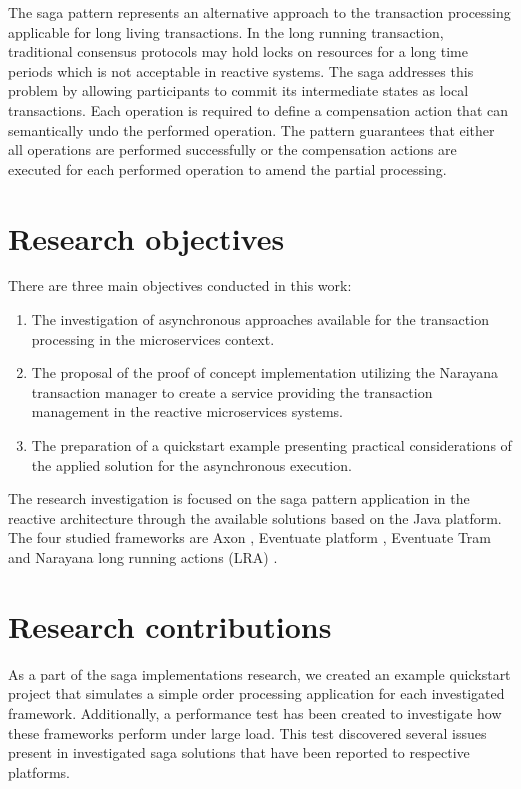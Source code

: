 \documentclass[oneside,
  digital, %
  table,   %
  nolof,     %
  nolot,     %
]{fithesis3}
\begin{document}
The saga pattern \cite{sagas_publ} represents an alternative approach to the transaction processing applicable for long living transactions. In the long running transaction, traditional consensus protocols may hold locks on resources for a long time periods which is not acceptable in reactive systems. The saga addresses this problem by allowing participants to commit its intermediate states as local transactions. Each operation is required to define a compensation action that can semantically undo the performed operation. The pattern guarantees that either all operations are performed successfully or the compensation actions are executed for each performed operation to amend the partial processing.

\section{Research objectives}

There are three main objectives conducted in this work:

\begin{enumerate}
    \item The investigation of asynchronous approaches available for the transaction processing in the microservices context.
    
    \item The proposal of the proof of concept implementation utilizing the Narayana transaction manager to create a service providing the transaction management in the reactive microservices systems.
    
    \item The preparation of a quickstart example presenting practical considerations of the applied solution for the asynchronous execution.
\end{enumerate}

The research investigation is focused on the saga pattern \cite{sagas_publ} application in the reactive architecture through the available solutions based on the Java platform. The four studied frameworks are Axon \cite{axon_framework}, Eventuate platform \cite{eventuate.io}, Eventuate Tram \cite{eventuate-tram} and Narayana long running actions (LRA) \cite{narayana_lra}. 

\section{Research contributions}

As a part of the saga implementations research, we created an example quickstart project that simulates a simple order processing application for each investigated framework. Additionally, a performance test has been created to investigate how these frameworks perform under large load. This test discovered several issues present in investigated saga solutions that have been reported to respective platforms.
\end{document}
